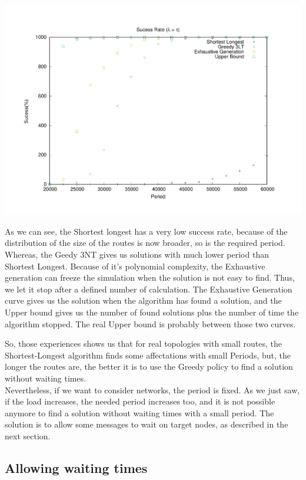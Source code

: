 \documentclass[a4paper,10pt]{article}
\begin{document}
       \begin{center}
      \includegraphics[scale=0.4]{echec_longues.pdf}
      \end{center}
     
      
      As we can see, the Shortest longest has a very low success rate, because of the distribution of the size of the routes is now broader, so is the required period.
      Whereas, the Geedy 3NT gives us solutions with much lower period than Shortest Longest.
      Because of it's polynomial complexity, the Exhaustive generation can freeze the simulation when the solution is not easy to find. Thus, we let it stop after a defined number of calculation. 
      The Exhaustive Generation curve gives us the solution when the algorithm has found a solution, and the Upper bound gives us the number of found solutions plus the number of time the algorithm stopped. The real Upper bound is probably between those two curves.
      
      So, those experiences shows us that for real topologies with small routes, the Shortest-Longest algorithm finds some affectations with small Periods, but, the longer the routes are, the better it is to use the Greedy policy to find a solution without waiting times.\\
      Nevertheless, if we want to consider networks, the period is fixed. As we just saw, if the load increases, the needed period increases too, and it is not possible anymore to find a solution without waiting times with a small period. The solution is to allow some messages to wait on target nodes, as described in the next section.
      
   \subsection{Allowing waiting times}
   
\end{document}
